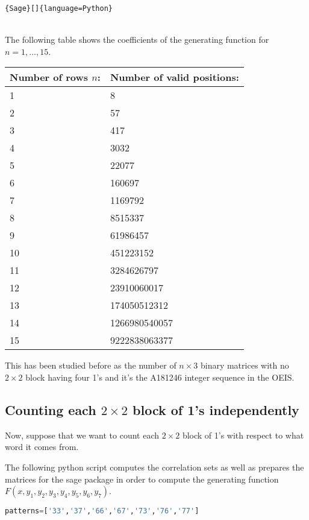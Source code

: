 \documentclass[12pt]{report}
\begin{document}
{{{\begin{lstlisting}{Sage}[]{language=Python}
\end{lstlisting}} \quad \\


\noindent The following table shows the coefficients of the generating function for $n=1,\ldots,15$.

\begin{center}
\begin{tabular}{ |p{3cm}|p{3cm}|  }
 \hline
 Number of rows 	$n$: & Number of valid positions: \\
 \hline
 1   & 8    \\
 2 &   57  \\
 3 & 417 \\
 4    & 3032 \\
 5 &   22077  \\
 6 & 160697  \\
 7 & 1169792  \\
 8 & 8515337  \\
 9 & 61986457  \\
 10 & 451223152  \\
 11 & 3284626797  \\
 12 & 23910060017  \\
 13 & 174050512312  \\
 14 & 1266980540057  \\
 15 & 9222838063377  \\
 \hline
\end{tabular}
\end{center}


\noindent This has been studied before as the number of $n \times 3$ binary matrices with no $2 \times 2$ block having four 1's and it's the A181246 integer sequence in the OEIS.




\subsection{Counting each $2 \times 2$ block of 1's independently}

\noindent Now, suppose that we want to count each $2 \times 2$ block of 1's with respect to what word it comes from.

\noindent The following python script computes the correlation sets as well as prepares the matrices for the sage package in order to compute the generating function $F(x,y_1,y_2,y_3,y_4,y_5,y_6,y_7)$.
{
\begin{lstlisting}[language=Python]
patterns=['33','37','66','67','73','76','77']


\end{lstlisting}}}}
\end{document}

